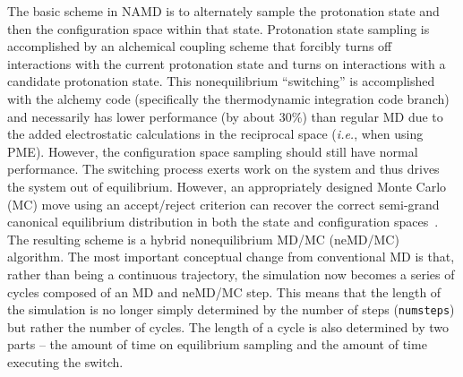 The basic scheme in NAMD is to alternately sample the protonation state and
  then the configuration space within that state.
Protonation state sampling is accomplished by an alchemical coupling scheme
  that forcibly turns off interactions with the current protonation state and
  turns on interactions with a candidate protonation state.
This nonequilibrium ``switching'' is accomplished with the alchemy code 
  (specifically the thermodynamic integration code branch) and necessarily has
  lower performance (by about 30\%) than regular MD due to the added
  electrostatic calculations in the reciprocal space (\textit{i.e.}, when
  using PME).
However, the configuration space sampling should still have normal performance.
The switching process exerts work on the system and thus drives the system out
  of equilibrium.
However, an appropriately designed Monte Carlo (MC) move using an accept/reject
  criterion can recover the correct semi-grand canonical equilibrium 
  distribution in both the state and configuration
  spaces~\cite{Nilmeier_ProcNatlAcadSci_2011_v108_pE1009,
    Chen_JChemPhys_2015_v142_p024101}.
The resulting scheme is a hybrid nonequilibrium MD/MC (neMD/MC) algorithm.
The most important conceptual change from conventional MD is that, rather than
  being a continuous trajectory, the simulation now becomes a series of cycles
  composed of an MD and neMD/MC step.
This means that the length of the simulation is no longer simply determined by
  the number of steps (\texttt{numsteps}) but rather the number of cycles.
The length of a cycle is also determined by two parts -- the amount of time on
  equilibrium sampling and the amount of time executing the switch.

